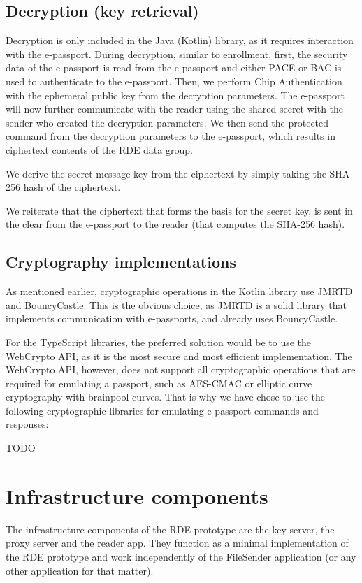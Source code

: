 \subsection{Decryption (key retrieval)}\label{subsec:decryption-key-retrieval}
Decryption is only included in the Java (Kotlin) library, as it requires interaction with the e-passport.
During decryption, similar to enrollment, first, the security data of the e-passport is read from the e-passport and either PACE or BAC is used to authenticate to the e-passport.
Then, we perform Chip Authentication with the ephemeral public key from the decryption parameters.
The e-passport will now further communicate with the reader using the shared secret with the sender who created the decryption parameters.
We then send the protected command from the decryption parameters to the e-passport, which results in ciphertext contents of the RDE data group.

We derive the secret message key from the ciphertext by simply taking the SHA-256 hash of the ciphertext.

We reiterate that the ciphertext that forms the basis for the secret key, is sent in the clear from the e-passport to the reader (that computes the SHA-256 hash).

\subsection{Cryptography implementations}\label{subsec:cryptography-implementations}
As mentioned earlier, cryptographic operations in the Kotlin library use JMRTD and BouncyCastle. 
This is the obvious choice, as JMRTD is a solid library that implements communication with e-passports, and already uses BouncyCastle.

For the TypeScript libraries, the preferred solution would be to use the WebCrypto API, as it is the most secure and most efficient implementation. 
The WebCrypto API, however, does not support all cryptographic operations that are required for emulating a passport, such as AES-CMAC or elliptic curve cryptography with brainpool curves. 
That is why we have chose to use the following cryptographic libraries for emulating e-passport commands and responses: 

TODO

\section{Infrastructure components}\label{sec:infrastructure-components}
The infrastructure components of the RDE prototype are the key server, the proxy server and the reader app.
They function as a minimal implementation of the RDE prototype and work independently of the FileSender application (or any other application for that matter).


